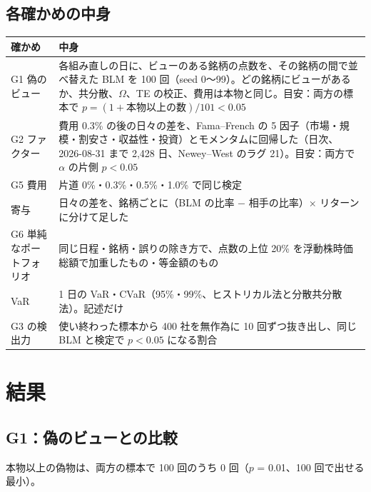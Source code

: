 \documentclass[xelatex,ja=standard,jafont=haranoaji,a4paper,10pt,openany]{bxjsreport}
\begin{document}
\section{各確かめの中身}

\begin{longtable}{p{2.4cm}p{12.2cm}}
\toprule
\textbf{確かめ} & \textbf{中身} \\
\midrule
\endhead
\bottomrule
\endfoot
G1 偽のビュー & 各組み直しの日に、ビューのある銘柄の点数を、その銘柄の間で並べ替えた BLM を 100 回（seed 0〜99）。どの銘柄にビューがあるか、共分散、$\Omega$、TE の校正、費用は本物と同じ。目安：両方の標本で $p = (1 + \text{本物以上の数}) / 101 < 0.05$ \\
G2 ファクター & 費用 0.3\% の後の日々の差を、Fama--French の 5 因子（市場・規模・割安さ・収益性・投資）とモメンタムに回帰した（日次、2026-08-31 まで 2,428 日、Newey--West のラグ 21）。目安：両方で $\alpha$ の片側 $p < 0.05$ \\
G5 費用 & 片道 0\%・0.3\%・0.5\%・1.0\% で同じ検定 \\
寄与 & 日々の差を、銘柄ごとに（BLM の比率 $-$ 相手の比率）× リターンに分けて足した \\
G6 単純なポートフォリオ & 同じ日程・銘柄・誤りの除き方で、点数の上位 20\% を浮動株時価総額で加重したもの・等金額のもの \\
VaR & 1 日の VaR・CVaR（95\%・99\%、ヒストリカル法と分散共分散法）。記述だけ \\
G3 の検出力 & 使い終わった標本から 400 社を無作為に 10 回ずつ抜き出し、同じ BLM と検定で $p < 0.05$ になる割合 \\
\end{longtable}

\chapter{結果}\label{ch:results}

\section{G1：偽のビューとの比較}

\begin{verdict}[G1：両方の標本で目安を満たした]
本物以上の偽物は、両方の標本で 100 回のうち 0 回（$p$ = 0.01、100 回で出せる最小）。
\end{verdict}
\end{document}
